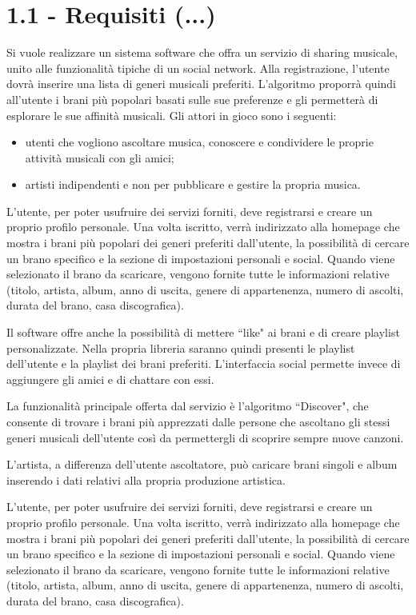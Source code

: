 \section*{1.1 - Requisiti (...)}
Si vuole realizzare un sistema software che offra un servizio di sharing musicale, unito alle funzionalità tipiche di un social network. Alla registrazione, l'utente dovrà inserire una lista di generi musicali preferiti. L'algoritmo proporrà quindi all'utente i brani più popolari basati sulle sue preferenze e gli permetterà di esplorare le sue affinità musicali. Gli attori in gioco sono i seguenti: \par
\begin{itemize}
    \item  utenti che vogliono ascoltare musica, conoscere e condividere le proprie attività musicali con gli amici;
    \item  artisti indipendenti e non per pubblicare e gestire la propria musica.
\end{itemize}
\par
L'utente, per poter usufruire dei servizi forniti, deve registrarsi e creare un proprio profilo personale. Una volta iscritto, verrà indirizzato alla homepage che mostra i brani più popolari dei generi preferiti dall'utente, la possibilità di cercare un brano specifico e la sezione di impostazioni personali e social. Quando viene selezionato il brano da scaricare, vengono fornite tutte le informazioni relative (titolo, artista, album, anno di uscita, genere di appartenenza, numero di ascolti, durata del brano, casa discografica).
\par 
Il software offre anche la possibilità di mettere “like" ai brani e di creare playlist personalizzate. Nella propria libreria saranno quindi presenti le playlist dell'utente e la playlist dei brani preferiti. L'interfaccia social permette invece di aggiungere gli amici e di chattare con essi.
\par 
La funzionalità principale offerta dal servizio è l'algoritmo “Discover", che consente di trovare i brani più apprezzati dalle persone che ascoltano gli stessi generi musicali dell'utente così da permettergli di scoprire sempre nuove canzoni.
\par 
L'artista, a differenza dell'utente ascoltatore, può caricare brani singoli e album inserendo i dati relativi alla propria produzione artistica. 
\par
L'utente, per poter usufruire dei servizi forniti, deve registrarsi e creare un proprio profilo personale. Una volta iscritto, verrà indirizzato alla homepage che mostra i brani più popolari dei generi preferiti dall'utente, la possibilità di cercare un brano specifico e la sezione di impostazioni personali e social. Quando viene selezionato il brano da scaricare, vengono fornite tutte le informazioni relative (titolo, artista, album, anno di uscita, genere di appartenenza, numero di ascolti, durata del brano, casa discografica).
